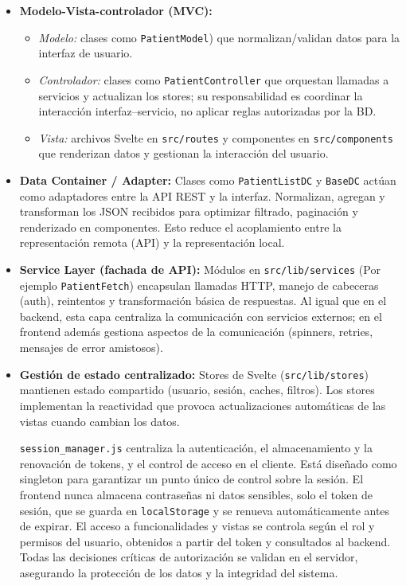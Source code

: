 \documentclass[12pt, a4paper]{article}
\begin{document}
\begin{itemize}
	\item \textbf{Modelo-Vista-controlador (MVC):}
	\begin{itemize}
		\item \emph{Modelo:} clases como \texttt{PatientModel}) que normalizan/validan datos para la interfaz de usuario.
		\item \emph{Controlador:} clases como \texttt{PatientController} que orquestan llamadas a servicios y actualizan los stores; su responsabilidad es coordinar la interacción interfaz–servicio, no aplicar reglas autorizadas por la BD.
		\item \emph{Vista:} archivos Svelte en \texttt{src/routes} y componentes en \texttt{src/components} que renderizan datos y gestionan la interacción del usuario.
	\end{itemize}
	
	
	\item \textbf{Data Container / Adapter:}  
	Clases como \texttt{PatientListDC} y \texttt{BaseDC} actúan como adaptadores entre la API REST y la interfaz. Normalizan, agregan y transforman los JSON recibidos para optimizar filtrado, paginación y renderizado en componentes. Esto reduce el acoplamiento entre la representación remota (API) y la representación local.
	
	\item \textbf{Service Layer (fachada de API):}  
	Módulos en \texttt{src/lib/services} (Por ejemplo \texttt{PatientFetch}) encapsulan llamadas HTTP, manejo de cabeceras (auth), reintentos y transformación básica de respuestas. Al igual que en el backend, esta capa centraliza la comunicación con servicios externos; en el frontend además gestiona aspectos de la comunicación (spinners, retries, mensajes de error amistosos).
	
	\item \textbf{Gestión de estado centralizado:}  
	Stores de Svelte (\texttt{src/lib/stores}) mantienen estado compartido (usuario, sesión, caches, filtros). Los stores implementan la reactividad que provoca actualizaciones automáticas de las vistas cuando cambian los datos.
		
	\texttt{session\_manager.js} centraliza la autenticación, el almacenamiento y la renovación de tokens, y el control de acceso en el cliente. Está diseñado como singleton para garantizar un punto único de control sobre la sesión. El frontend nunca almacena contraseñas ni datos sensibles, solo el token de sesión, que se guarda en \texttt{localStorage} y se renueva automáticamente antes de expirar. El acceso a funcionalidades y vistas se controla según el rol y permisos del usuario, obtenidos a partir del token y consultados al backend. Todas las decisiones críticas de autorización se validan en el servidor, asegurando la protección de los datos y la integridad del sistema.
	

\end{itemize}
\end{document}
